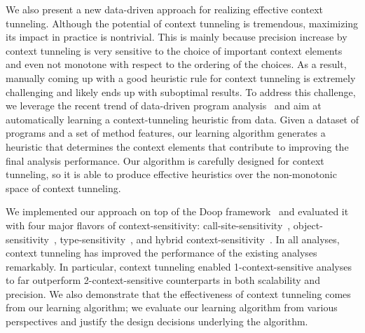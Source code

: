We also present a new data-driven approach for realizing effective context
tunneling.  Although the potential of context tunneling is
tremendous, maximizing its impact  in practice is nontrivial.  This is mainly
because precision increase by context tunneling is very sensitive to the
choice of important context elements and even not monotone with respect to the ordering of the
choices. As a result, manually coming up with a good heuristic rule
for context tunneling is extremely challenging and likely ends up with
suboptimal results.  To address this challenge, we leverage the recent
trend of data-driven program analysis~\cite{JeJeChOh17,Oh2015,
  Heo2016learning,heo2016unsound,WeiR15,Singh2018cav,ChOhHeYa17} and aim at automatically
learning a context-tunneling heuristic from data.  Given a dataset of
programs and a set of method features, our learning algorithm
generates a heuristic that determines the context elements that
contribute to improving the final analysis performance. Our algorithm
is carefully designed for context tunneling, so it is able to produce
effective heuristics over the non-monotonic space of context
tunneling.




We implemented our approach on top of
the Doop framework~\cite{Bravenboer2009} and evaluated it with four
major flavors of context-sensitivity: call-site-sensitivity~\cite{Shivers1988},
object-sensitivity~\cite{Milanova2002, Milanova2005}, type-sensitivity~\cite{Smaragdakis2011},
and hybrid context-sensitivity~\cite{KastrinisS13a}.
In all analyses, context tunneling has improved the performance of the
existing analyses remarkably.
In particular, context tunneling enabled 1-context-sensitive analyses
to far outperform 2-context-sensitive
counterparts in both scalability and precision.
We also demonstrate that the effectiveness of context tunneling comes from our learning algorithm; we
evaluate our learning algorithm from various perspectives and justify
the design decisions underlying the algorithm.

